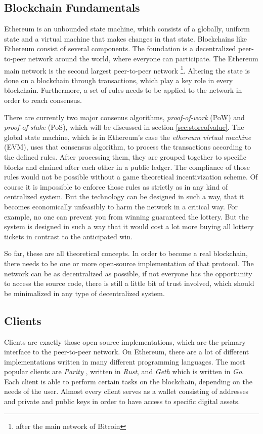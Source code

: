 \subsection{Blockchain Fundamentals}
Ethereum is an unbounded state machine, which consists of a globally, uniform state and a virtual machine that makes changes in that state. Blockchains like Ethereum
consist of several components. The foundation is a decentralized peer-to-peer network around the world, where everyone can participate. The Ethereum main network is the second largest peer-to-peer network \footnote{after the main network of Bitcoin}. Altering the state is done on a blockchain through transactions, which play a key role in
every blockchain. Furthermore, a set of rules needs to be applied to the network in order to reach consensus.

There are currently two major consenus algorithms,
\textit{proof-of-work} (PoW) and \textit{proof-of-stake} (PoS), which will be discussed in section \ref{sec:storeofvalue}. The global state machine, which is in Ethereum's case the \textit{ethereum virtual machine} (EVM), uses that consensus algorithm, to process the transactions according to the defined rules. After processing them, they are grouped together to
specific blocks and chained after each other in a public ledger. The compliance of those rules would not be possible without a game theoretical incentivization
scheme. Of course it is impossible to enforce those rules as strictly as in any kind of centralized system. But the technology can be designed in such a way, that
it becomes economically unfeasibly to harm the network in a critical way. For example, no one can prevent you from winning guaranteed the lottery. But the system
is designed in such a way that it would cost a lot more buying all lottery tickets in contrast to the anticipated win.

So far, these are all theoretical concepts. In order to become a real blockchain, there needs to be one or more open-source implementation of that protocol. The
network can be as decentralized as possible, if not everyone has the opportunity to access the source code, there is still a little bit of trust involved, which
should be minimalized in any type of decentralized system.

\subsection{Clients}
Clients are exactly those open-source implementations, which are the primary interface to the peer-to-peer network. On Ethereum, there are a lot of different
implementations written in many different programming languages. The most popular clients are \textit{Parity} \cite{Parity}, written in \textit{Rust}, and \textit{Geth} \cite{Geth} which is written in \textit{Go}. Each client
is able to perform certain tasks on the blockchain, depending on the needs of the user. Almost every client serves as a wallet consisting of addresses and private and
public keys in order to have access to specific digital assets.

